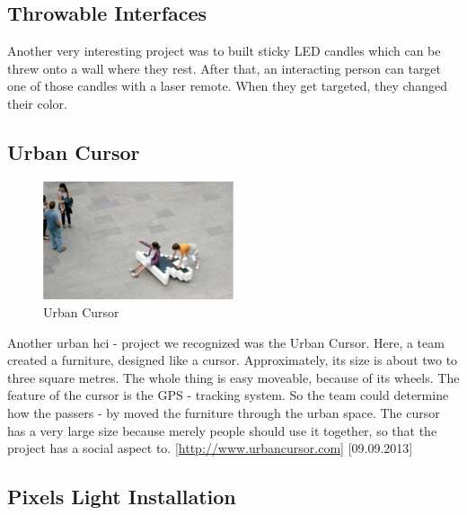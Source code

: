 \subsection{Throwable Interfaces}
Another very interesting project was to built sticky LED candles which can be threw onto a wall where they rest. After that, an interacting person can target one of those candles with a laser remote. When they get targeted, they changed their color. \newline

\subsection{Urban Cursor}

\begin{figure}[h!]
	\centering
	\includegraphics[width=0.5\textwidth, clip=true, keepaspectratio=true]{./pic/urban_cursor.png}
	\caption{Urban Cursor}
	\label{fig:urban_cursor}
\end{figure}

Another urban hci - project we recognized was the Urban Cursor.\newline 
Here, a team created a furniture, designed like a cursor. Approximately, its size is about two to three square metres. The whole thing is easy moveable, because of its wheels. The feature of the cursor is the GPS - tracking system. So the team could determine how the passers - by moved the furniture through the urban space.\newline
The cursor has a very large size because merely people should use it together, so that the project has a social aspect to.
[{\url{http://www.urbancursor.com}}] [09.09.2013] 

\subsection{Pixels Light Installation}

